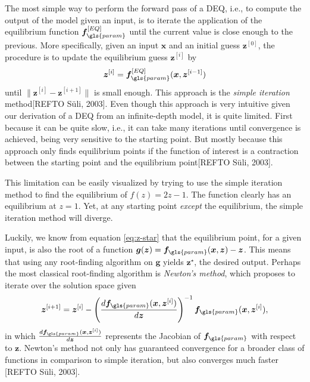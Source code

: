 The most simple way to perform the forward pass of a \gls{DEQ}, i.e., to compute the output of the model given an input, is to iterate the application of the equilibrium function $\bm{f}_{\gls{param}}^{[EQ]}$ until the current value is close enough to the previous.
More specifically, given an input $\bm{x}$ and an initial guess $\bm{z}^{[0]}$, the procedure is to update the equilibrium guess $\bm{z}^{[i]}$ by \[
    \bm{z}^{[i]} = \bm{f}_{\gls{param}}^{[EQ]}(\bm{x}, \bm{z}^{[i-1]})
\] until $\|\bm{z}^{[i]}-\bm{z}^{[i+1]}\|$ is small enough.
This approach is the \emph{simple iteration} method[REFTO Süli, 2003].
Even though this approach is very intuitive given our derivation of a \gls{DEQ} from an infinite-depth model, it is quite limited.
First because it can be quite slow, i.e., it can take many iterations until convergence is achieved, being very sensitive to the starting point.
But mostly because this approach only finds equilibrium points if the function of interest is a contraction between the starting point and the equilibrium point[REFTO Süli, 2003].

This limitation can be easily visualized by trying to use the simple iteration method to find the equilibrium of $f(z) = 2z-1$.
The function clearly has an equilibrium at $z=1$.
Yet, at any starting point \emph{except} the equilibrium, the simple iteration method will diverge.

Luckily, we know from equation \eqref{eq:z-star} that the equilibrium point, for a given input, is also the root of a function $\bm{g}(\bm{z}) = \bm{f}_{\gls{param}}(\bm{x},\bm{z}) - \bm{z}$.
This means that using any root-finding algorithm on $\bm{g}$ yields $\bm{z}^{\star}$, the desired output.
Perhaps the most classical root-finding algorithm is \emph{Newton's method}, which proposes to iterate over the solution space given \[
    \bm{z}^{[i+1]} = \bm{z}^{[i]} - \left( \frac{d \bm{f}_{\gls{param}}(\bm{x},\bm{z}^{[i]})}{d\bm{z}} \right)^{-1} \bm{f}_{\gls{param}}(\bm{x},\bm{z}^{[i]})
,\] 
in which $\frac{d \bm{f}_{\gls{param}}(\bm{x},\bm{z}^{[i]})}{d\bm{z}}$ represents the Jacobian of  $\bm{f}_{\gls{param}}$ with respect to $\bm{z}$\footnotemark.
Newton's method not only has guaranteed convergence for a broader class of functions in comparison to simple iteration, but also converges much faster [REFTO Süli, 2003].


